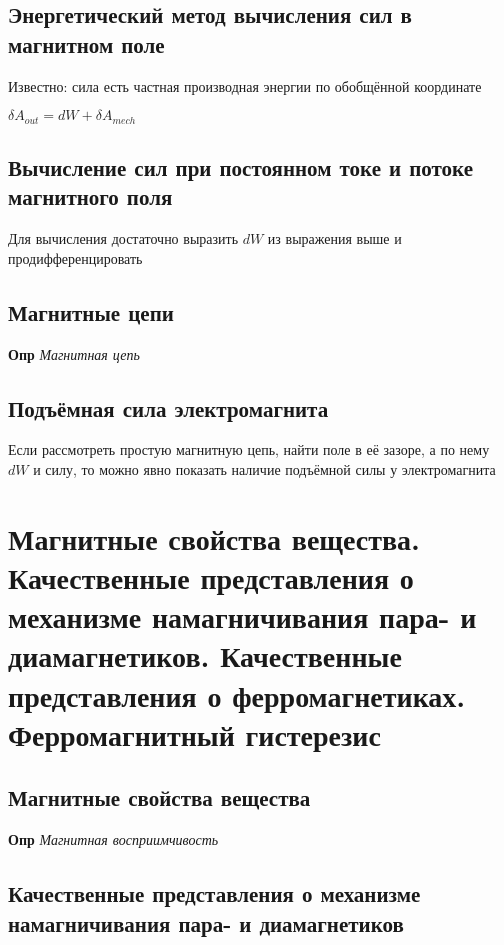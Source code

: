 \documentclass[a4paper, 14pt]{article}
\begin{document}
    \subsection{Энергетический метод вычисления сил в магнитном поле}
    
    Известно: сила есть частная производная энергии по обобщённой координате
    
    $\delta A_{out} = dW + \delta A_{mech}$
    
    \subsection{Вычисление сил при постоянном токе и потоке магнитного поля}
    
    Для вычисления достаточно выразить $dW$ из выражения выше и продифференцировать
    
    \subsection{Магнитные цепи}
    
    \textbf{Опр} \textit{Магнитная цепь}
    
    \subsection{Подъёмная сила электромагнита}
    
    Если рассмотреть простую магнитную цепь, найти поле в её зазоре, а по нему $dW$ и силу, то можно явно показать
    наличие подъёмной силы у электромагнита
    
    \section{Магнитные свойства вещества.
    Качественные представления о механизме намагничивания пара- и диамагнетиков.
    Качественные представления о ферромагнетиках.
    Ферромагнитный гистерезис}
    
    \subsection{Магнитные свойства вещества}
    
    \textbf{Опр} \textit{Магнитная восприимчивость}
    
    \subsection{Качественные представления о механизме намагничивания пара- и диамагнетиков}
    
\end{document}
